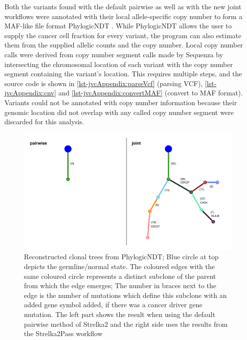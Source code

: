 Both the variants found with the default pairwise as well as with the new joint workflows were annotated with their local allele-specific copy number to form a MAF-like file format   PhylogicNDT . While PhylogicNDT allows the user to supply the cancer cell fraction for every variant, the program can also estimate them from the supplied allelic counts and the copy number. Local copy number calls were derived from copy number segment calls made by Sequenza by intersecting the chromosomal location of each variant with the copy number segment containing the variant's location. This  requires multiple steps, and the source code is shown in \autoref{lst-jvcAppendix:parseVcf} (parsing VCF), \autoref{lst-jvcAppendix:cnv} and \autoref{lst-jvcAppendix:convertMAF} (convert to MAF format). Variants  could not be annotated with copy number information because their genomic location did not overlap with any called copy number segment were discarded for this analysis.

\begin{figure}[ht]
\centering
\includegraphics[width=.99\linewidth]{Figures/jointVariantCalling/clonalDeconv.pdf}
\caption[Reconstructed clonal trees for joint and pairwise variant calling]{Reconstructed clonal trees from PhylogicNDT; Blue circle at top depicts the germline/normal state. The coloured edges with the same coloured circle represents a distinct subclone of the parent from which the edge emerges; The number in braces next to the edge is the number of mutations which define this subclone with an added gene symbol added, if there was a cancer driver gene mutation. The left part shows the result when using the default pairwise method of Strelka2 and the right side uses the results from the Strelka2Pass workflow}\label{fig:clonaldeconv}
\end{figure}


